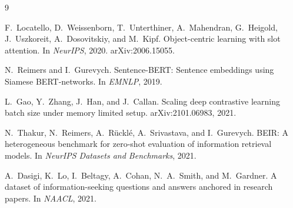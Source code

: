 \documentclass[10pt,twocolumn,letterpaper]{article}
\begin{document}
\begin{thebibliography}{9}

F.~Locatello, D.~Weissenborn, T.~Unterthiner, A.~Mahendran, G.~Heigold,
J.~Uszkoreit, A.~Dosovitskiy, and M.~Kipf.
\newblock Object-centric learning with slot attention.
\newblock In \emph{NeurIPS}, 2020. arXiv:2006.15055.

N.~Reimers and I.~Gurevych.
\newblock Sentence-BERT: Sentence embeddings using Siamese BERT-networks.
\newblock In \emph{EMNLP}, 2019.

L.~Gao, Y.~Zhang, J.~Han, and J.~Callan.
\newblock Scaling deep contrastive learning batch size under memory limited
setup.
\newblock arXiv:2101.06983, 2021.

N.~Thakur, N.~Reimers, A.~R{\"u}ckl{\'e}, A.~Srivastava, and I.~Gurevych.
\newblock BEIR: A heterogeneous benchmark for zero-shot evaluation of
information retrieval models.
\newblock In \emph{NeurIPS Datasets and Benchmarks}, 2021.

A.~Dasigi, K.~Lo, I.~Beltagy, A.~Cohan, N.~A.~Smith, and M.~Gardner.
\newblock A dataset of information-seeking questions and answers anchored in
research papers.
\newblock In \emph{NAACL}, 2021.

\end{thebibliography}
\end{document}
